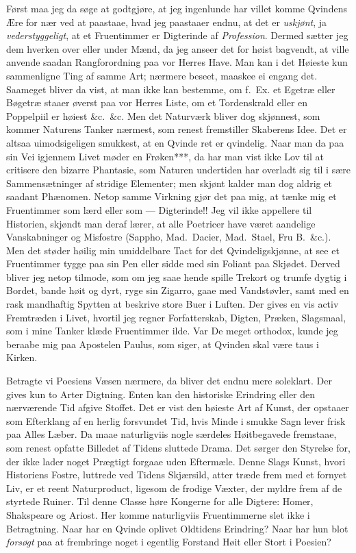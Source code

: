 \documentclass[12pt]{article}
\newcommand{\opage}[1]{\marginnote{\footnotesize\textit{[#1]}}}
\begin{document}
Først maa jeg da søge at godtgjøre, at jeg ingenlunde har villet komme Qvindens
Ære for nær ved at paastaae, hvad jeg paastaaer endnu, at det er \emph{uskjønt},
ja \emph{vederstyggeligt}, at et Fruentimmer er Digterinde af \emph{Profession}.
Dermed sætter jeg dem hverken over eller under Mænd, da jeg anseer det for høist
bagvendt, at ville anvende saadan Rangforordning paa vor Herres Have. Man kan i
det Høieste kun sammenligne Ting af samme Art; nærmere beseet, maaskee ei engang
det. Saameget bliver da vist, at man ikke kan bestemme, om f.~Ex. et Egetræ eller
Bøgetræ staaer øverst paa vor Herres Liste, om et Tordenskrald eller en Poppelpiil
er høiest \&c.\ \&c. Men det Naturværk bliver dog skjønnest, som kommer Naturens
Tanker nærmest, som renest fremstiller Skaberens Idee. Det er altsaa
uimodsigeligen smukkest, at en Qvinde ret er qvindelig. Naar man da paa sin Vei
igjennem Livet møder en Frøken***, da har man vist ikke Lov til at critisere den
bizarre Phantasie, som Naturen undertiden har overladt sig til i sære
Sammensætninger af stridige Elementer; men skjønt kalder man dog aldrig et saadant
Phænomen. Netop samme Virkning gjør det paa mig, at tænke mig et Fruentimmer som
lærd eller som --- Digterinde!! Jeg vil ikke appellere til Historien, skjøndt man
deraf lærer, at alle Poetricer have været aandelige Vanskabninger og Misfostre
(Sappho, Mad.\ Dacier, Mad.\ Stael, Fru B.\ \&c.). Men det støder høilig min
umiddelbare Tact for det Qvindeligskjønne, at see et Fruentimmer tygge \opage{11}%
paa sin Pen eller sidde med sin Foliant paa Skjødet. Derved bliver jeg netop
tilmode, som om jeg saae hende spille Trekort og trumfe dygtig i Bordet, bande høit
og dyrt, ryge sin Zigarro, gaae med Vandstøvler, samt med en rask mandhaftig
Spytten at beskrive store Buer i Luften. Der gives en vis activ Fremtræden i
Livet, hvortil jeg regner Forfatterskab, Digten, Præken, Slagsmaal, som i mine
Tanker klæde Fruentimmer ilde. Var De meget orthodox, kunde jeg beraabe mig paa
Apostelen Paulus, som siger, at Qvinden skal være taus i Kirken.

Betragte vi Poesiens Væsen nærmere, da bliver det endnu mere soleklart. Der gives
kun to Arter Digtning. Enten kan den historiske Erindring eller den nærværende Tid
afgive Stoffet. Det er vist den høieste Art af Kunst, der opstaaer som Efterklang
af en herlig forsvundet Tid, hvis Minde i smukke Sagn lever frisk paa Alles Læber.
Da maae naturligviis nogle særdeles Høitbegavede fremstaae, som renest opfatte
Billedet af Tidens sluttede Drama. Det sørger den Styrelse for, der ikke lader
noget Prægtigt forgaae uden Eftermæle. Denne Slags Kunst, hvori Historiens Fostre,
luttrede ved Tidens Skjærsild, atter træde frem med et fornyet Liv, er et reent
Naturproduct, ligesom de frodige Væxter, der myldre frem af de styrtede Ruiner.
Til denne Classe høre Kongerne for alle Digtere: Homer, Shakspeare og Ariost. Her
komme naturligviis Fruentimmerne slet ikke i Betragtning. Naar har en Qvinde
oplivet Oldtidens Erindring? Naar har hun blot \emph{forsøgt} paa at frembringe
noget i egentlig Forstand Høit eller Stort i Poesien?
\end{document}
